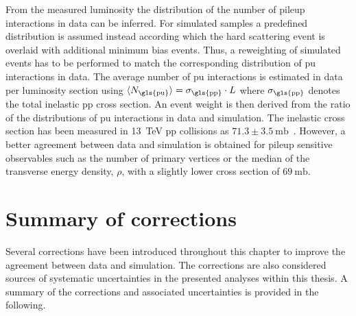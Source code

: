From the measured luminosity the distribution of the number of pileup interactions in data can be inferred. For simulated samples a predefined distribution is assumed instead according which the hard scattering event is overlaid with additional minimum bias events. Thus, a reweighting of simulated events has to be performed to match the corresponding distribution of \gls{pu} interactions in data. 
The average number of \gls{pu} interactions is estimated in data per luminosity section using $\langle N_\mathrm{\gls{pu}}\rangle=\sigma_\mathrm{\gls{pp}}\cdot L$ where $\sigma_\mathrm{\gls{pp}}$ denotes the total inelastic \gls{pp} cross section. An event weight is then derived from the ratio of the distributions of \gls{pu} interactions in data and simulation. The inelastic cross section has been measured in 13~TeV \gls{pp} collisions as $71.3\pm3.5~\mathrm{mb}$~\cite{CMS-PAS-FSQ-15-005}. However, a better agreement between data and simulation is obtained for pileup sensitive observables such as the number of primary vertices or the median of the transverse energy density, $\rho$, with a slightly lower cross section of $69~\mathrm{mb}$. 


\section{Summary of corrections}
\label{sec:reconstruction-summary}

Several corrections have been introduced throughout this chapter to improve the agreement between data and simulation. The corrections are also considered sources of systematic uncertainties in the presented analyses within this thesis. A summary of the corrections and associated uncertainties is provided in the following.

